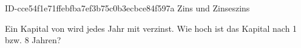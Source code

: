 \begin{exercise}
      {ID-cce54f1e71ffebfba7ef3b75c0b3ecbce84f597a}
      {Zins und Zinseszins}
  \ifproblem\problem\par
    Ein Kapital von  wird jedes Jahr mit  verzinst. Wie
    hoch ist das Kapital nach \num{1} bzw. \num{8} Jahren?
  \fi
\end{exercise}
